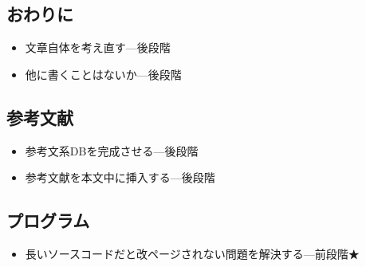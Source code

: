 	\subsection{おわりに}
		\begin{itemize}
		  \item 文章自体を考え直す---後段階
		  \item 他に書くことはないか---後段階
		\end{itemize}
	\subsection{参考文献}
		\begin{itemize}
		  \item 参考文系DBを完成させる---後段階
		  \item 参考文献を本文中に挿入する---後段階
		\end{itemize}
	\subsection{プログラム}
		\begin{itemize}
		  \item 長いソースコードだと改ページされない問題を解決する---前段階★
		\end{itemize}
